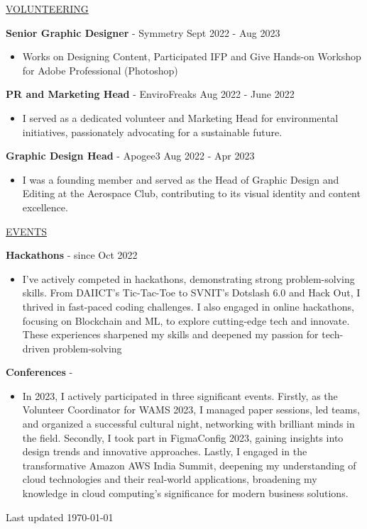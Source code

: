\documentclass[11pt]{article}
\newcommand{\betteruline}[1]{
    \uline{#1}
}
\newcommand{\sectiontitle}[1]{
    \begingroup
        \titlebold
        \betteruline{\Large\uppercase{#1}  }
        \vspace{1.7mm}
    \endgroup
}
\newcommand{\sectioncontent}[1]{
    \begingroup
        \begin{FlushLeft}
        \vspace{-3mm}
        \sffamily\small#1
        \end{FlushLeft}
    \endgroup
    \vspace{2mm}
}
\newcommand{\job}[3]{
    \begingroup
        \textbf{\small#1} - \small#2
        \hfill\color{black!70}\small{#3}
    \endgroup
}
\newcommand{\spacevv}{
    \vspace{2mm}
}
\begin{document}
\begin{paracol}{2}
{    }

    \sectiontitle{volunteering}
    \sectioncontent{
      
          \job{Senior Graphic Designer}{Symmetry}{Sept 2022 - Aug 2023}
          \begin{itemize}
            \item Works on Designing Content, Participated IFP and Give Hands-on Workshop for Adobe Professional (Photoshop)
          \end{itemize}
          \spacevv
        
          \job{PR and Marketing Head}{EnviroFreaks}{Aug 2022 - June 2022}
          \begin{itemize}
            \item I served as a dedicated volunteer and Marketing Head for environmental initiatives, passionately advocating for a sustainable future.
          \end{itemize}
        
          \job{Graphic Design Head}{Apogee3}{Aug 2022 - Apr 2023}
          \begin{itemize}
            \item I was a founding member and served as the Head of Graphic Design and Editing at the Aerospace Club, contributing to its visual identity and content excellence.
          \end{itemize}
          \spacevv

    }
    
    \sectiontitle{Events}
    \sectioncontent{
      
          \job{Hackathons}{}{since Oct 2022}
          \begin{itemize}
            \item I've actively competed in hackathons, demonstrating strong problem-solving skills. From DAIICT's Tic-Tac-Toe to SVNIT's Dotslash 6.0 and Hack Out, I thrived in fast-paced coding challenges. I also engaged in online hackathons, focusing on Blockchain and ML, to explore cutting-edge tech and innovate. These experiences sharpened my skills and deepened my passion for tech-driven problem-solving
          \end{itemize}
          \spacevv

          \job{Conferences}{}{}
          \begin{itemize}
            \item In 2023, I actively participated in three significant events. Firstly, as the Volunteer Coordinator for WAMS 2023, I managed paper sessions, led teams, and organized a successful cultural night, networking with brilliant minds in the field. Secondly, I took part in FigmaConfig 2023, gaining insights into design trends and innovative approaches. Lastly, I engaged in the transformative Amazon AWS India Summit, deepening my understanding of cloud technologies and their real-world applications, broadening my knowledge in cloud computing's significance for modern business solutions.
          \end{itemize}
          \spacevv
    }

    \normaltext \hfill \tiny Last updated \today

    \end{paracol}
\end{document}
